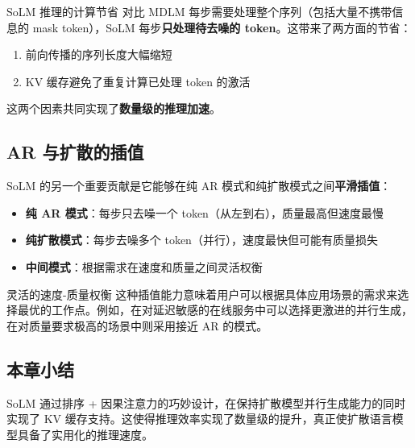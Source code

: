 \begin{importantbox}{SoLM 推理的计算节省}
对比 MDLM 每步需要处理整个序列（包括大量不携带信息的 mask token），SoLM 每步\textbf{只处理待去噪的 token}。这带来了两方面的节省：
\begin{enumerate}
    \item 前向传播的序列长度大幅缩短
    \item KV 缓存避免了重复计算已处理 token 的激活
\end{enumerate}
这两个因素共同实现了\textbf{数量级的推理加速}。
\end{importantbox}

\subsection{AR 与扩散的插值}

SoLM 的另一个重要贡献是它能够在纯 AR 模式和纯扩散模式之间\textbf{平滑插值}：

\begin{itemize}
    \item \textbf{纯 AR 模式}：每步只去噪一个 token（从左到右），质量最高但速度最慢
    \item \textbf{纯扩散模式}：每步去噪多个 token（并行），速度最快但可能有质量损失
    \item \textbf{中间模式}：根据需求在速度和质量之间灵活权衡
\end{itemize}

\begin{knowledgebox}{灵活的速度-质量权衡}
这种插值能力意味着用户可以根据具体应用场景的需求来选择最优的工作点。例如，在对延迟敏感的在线服务中可以选择更激进的并行生成，在对质量要求极高的场景中则采用接近 AR 的模式。
\end{knowledgebox}

\subsection{本章小结}

SoLM 通过排序 + 因果注意力的巧妙设计，在保持扩散模型并行生成能力的同时实现了 KV 缓存支持。这使得推理效率实现了数量级的提升，真正使扩散语言模型具备了实用化的推理速度。

\newpage

